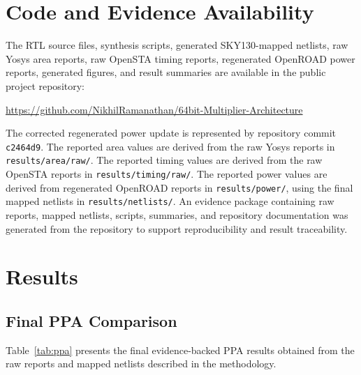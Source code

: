 \documentclass[conference]{IEEEtran}
\begin{document}
\section{Code and Evidence Availability}
The RTL source files, synthesis scripts, generated SKY130-mapped netlists, raw Yosys area reports, raw OpenSTA timing reports, regenerated OpenROAD power reports, generated figures, and result summaries are available in the public project repository:

\begin{center}
\url{https://github.com/NikhilRamanathan/64bit-Multiplier-Architecture}
\end{center}

The corrected regenerated power update is represented by repository commit \texttt{c2464d9}. The reported area values are derived from the raw Yosys reports in \texttt{results/area/raw/}. The reported timing values are derived from the raw OpenSTA reports in \texttt{results/timing/raw/}. The reported power values are derived from regenerated OpenROAD reports in \texttt{results/power/}, using the final mapped netlists in \texttt{results/netlists/}. An evidence package containing raw reports, mapped netlists, scripts, summaries, and repository documentation was generated from the repository to support reproducibility and result traceability.

\section{Results}

\subsection{Final PPA Comparison}
Table~\ref{tab:ppa} presents the final evidence-backed PPA results obtained from the raw reports and mapped netlists described in the methodology.

\begin{table}[t]
\centering
\caption{Final Evidence-Backed PPA Comparison}
\label{tab:ppa}
\scriptsize
{}
\end{table}
\end{document}
